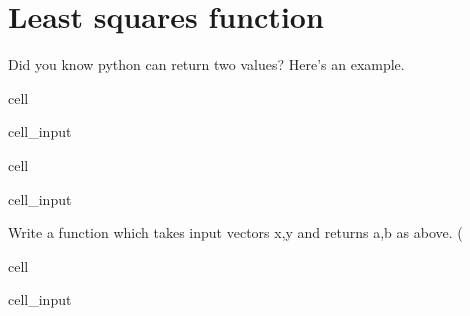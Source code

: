 \documentclass[letterpaper,10pt,english]{jupyterBook}
\begin{document}
\section{Least squares function}
\label{\detokenize{lessons/least-squares-01:least-squares-function}}
\sphinxAtStartPar
Did you know python can return two values? Here’s an example.

\begin{sphinxuseclass}{cell}\begin{sphinxVerbatimInput}

\begin{sphinxuseclass}{cell_input}
\begin{sphinxVerbatim}[commandchars=\\\{\}]
 
      
      
     
\end{sphinxVerbatim}

\end{sphinxuseclass}\end{sphinxVerbatimInput}

\end{sphinxuseclass}
\begin{sphinxuseclass}{cell}\begin{sphinxVerbatimInput}

\begin{sphinxuseclass}{cell_input}
\begin{sphinxVerbatim}[commandchars=\\\{\}]
   
\end{sphinxVerbatim}

\end{sphinxuseclass}\end{sphinxVerbatimInput}

\end{sphinxuseclass}
\sphinxAtStartPar
Write a function  which takes input vectors x,y and returns a,b as above. (

\begin{sphinxuseclass}{cell}\begin{sphinxVerbatimInput}

\begin{sphinxuseclass}{cell_input}
\begin{sphinxVerbatim}[commandchars=\\\{\}]
 
\end{sphinxVerbatim}

\end{sphinxuseclass}\end{sphinxVerbatimInput}

\end{sphinxuseclass}
\end{document}
